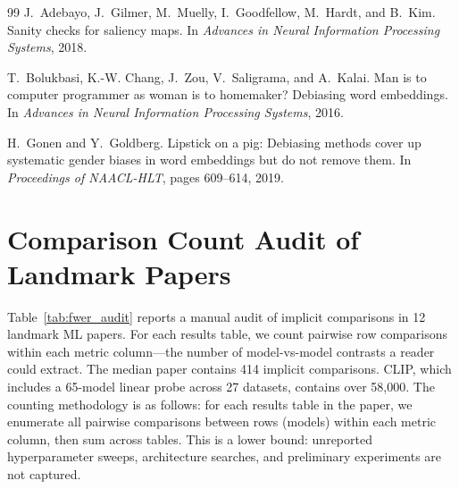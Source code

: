 \documentclass{article}
\begin{document}
\begin{thebibliography}{99}
J.~Adebayo, J.~Gilmer, M.~Muelly, I.~Goodfellow, M.~Hardt, and B.~Kim.
\newblock Sanity checks for saliency maps.
\newblock In \emph{Advances in Neural Information Processing Systems}, 2018.

T.~Bolukbasi, K.-W. Chang, J.~Zou, V.~Saligrama, and A.~Kalai.
\newblock Man is to computer programmer as woman is to homemaker? {Debiasing} word embeddings.
\newblock In \emph{Advances in Neural Information Processing Systems}, 2016.

H.~Gonen and Y.~Goldberg.
\newblock Lipstick on a pig: {Debiasing} methods cover up systematic gender biases in word embeddings but do not remove them.
\newblock In \emph{Proceedings of NAACL-HLT}, pages 609--614, 2019.

\end{thebibliography}


\appendix

\section{Comparison Count Audit of Landmark Papers}
\label{app:landmark_audit}

Table~\ref{tab:fwer_audit} reports a manual audit of implicit comparisons in 12 landmark ML papers. For each results table, we count pairwise row comparisons within each metric column---the number of model-vs-model contrasts a reader could extract. The median paper contains 414 implicit comparisons. CLIP, which includes a 65-model linear probe across 27 datasets, contains over 58,000. The counting methodology is as follows: for each results table in the paper, we enumerate all pairwise comparisons between rows (models) within each metric column, then sum across tables. This is a lower bound: unreported hyperparameter sweeps, architecture searches, and preliminary experiments are not captured.
\end{document}
